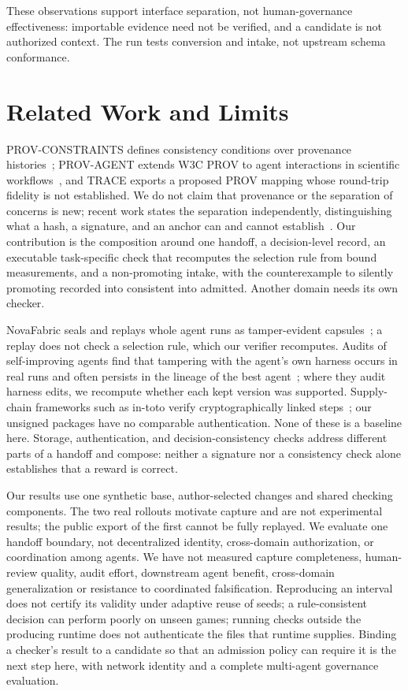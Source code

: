 \documentclass[conference]{IEEEtran}
\begin{document}
These observations support interface separation, not human-governance effectiveness: importable evidence need not be verified, and a candidate is not authorized context. The run tests conversion and intake, not upstream schema conformance.

\section{Related Work and Limits}

PROV-CONSTRAINTS defines consistency conditions over provenance histories~\cite{prov}; PROV-AGENT extends W3C PROV to agent interactions in scientific workflows~\cite{provagent}, and TRACE exports a proposed PROV mapping whose round-trip fidelity is not established. We do not claim that provenance or the separation of concerns is new; recent work states the separation independently, distinguishing what a hash, a signature, and an anchor can and cannot establish~\cite{broemme}. Our contribution is the composition around one handoff, a decision-level record, an executable task-specific check that recomputes the selection rule from bound measurements, and a non-promoting intake, with the counterexample to silently promoting recorded into consistent into admitted. Another domain needs its own checker.

NovaFabric seals and replays whole agent runs as tamper-evident capsules~\cite{novafabric}; a replay does not check a selection rule, which our verifier recomputes. Audits of self-improving agents find that tampering with the agent's own harness occurs in real runs and often persists in the lineage of the best agent~\cite{harness}; where they audit harness edits, we recompute whether each kept version was supported. Supply-chain frameworks such as in-toto verify cryptographically linked steps~\cite{intoto}; our unsigned packages have no comparable authentication. None of these is a baseline here. Storage, authentication, and decision-consistency checks address different parts of a handoff and compose: neither a signature nor a consistency check alone establishes that a reward is correct.

Our results use one synthetic base, author-selected changes and shared checking components. The two real rollouts motivate capture and are not experimental results; the public export of the first cannot be fully replayed. We evaluate one handoff boundary, not decentralized identity, cross-domain authorization, or coordination among agents. We have not measured capture completeness, human-review quality, audit effort, downstream agent benefit, cross-domain generalization or resistance to coordinated falsification. Reproducing an interval does not certify its validity under adaptive reuse of seeds; a rule-consistent decision can perform poorly on unseen games; running checks outside the producing runtime does not authenticate the files that runtime supplies. Binding a checker's result to a candidate so that an admission policy can require it is the next step here, with network identity and a complete multi-agent governance evaluation.
\end{document}
